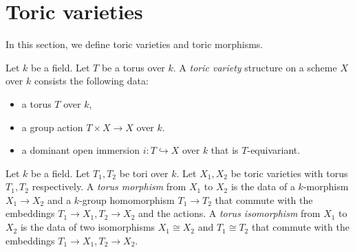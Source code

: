 \section{Toric varieties}


In this section, we define toric varieties and toric morphisms.


\begin{definition}
  \label{5-1-tor-var}
  \leanok

  Let $k$ be a field.
  Let $T$ be a torus over $k$.
  A \emph{toric variety} structure on a scheme $X$ over $k$ consists the following data:
  \begin{itemize}
    \item a torus $T$ over $k$,
    \item a group action $T \times X \to X$ over $k$.
    \item a dominant open immersion $i : T \hookrightarrow X$ over $k$ that is $T$-equivariant.
  \end{itemize}
\end{definition}


\begin{definition}
  \label{5-1-tor-hom}
  \leanok

  Let $k$ be a field.
  Let $T_1, T_2$ be tori over $k$.
  Let $X_1, X_2$ be toric varieties with torus $T_1, T_2$ respectively.
  A \emph{torus morphism} from $X_1$ to $X_2$ is the data of a $k$-morphism $X_1 \to X_2$
  and a $k$-group homomorphism $T_1 \to T_2$ that commute
  with the embeddings $T_1 \to X_1, T_2 \to X_2$ and the actions.
  A \emph{torus isomorphism} from $X_1$ to $X_2$ is the data of two isomorphisms $X_1 \cong X_2$ and
  $T_1 \cong T_2$ that commute with the embeddings $T_1 \to X_1, T_2 \to X_2$.
\end{definition}
